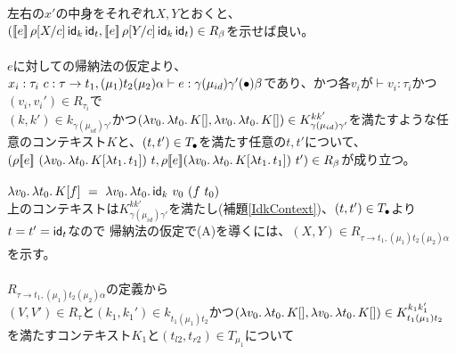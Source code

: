       左右の$x'$の中身をそれぞれ$X,Y$とおくと、\\
      $(\CPS{e}{\rho[\Change{c}{X}]}{\Idk}{\Idt},\CPS{e}{\rho[\Change{c}{Y}]}{\Idk}{\Idt})\in R_{\beta}$を示せば良い。\\
\\
$e$に対しての帰納法の仮定より、\\
$x_i:\tau_i\ c:\tau \rightarrow t_1, (\mu_1) t_2 (\mu_2) \alpha \vdash e : \gamma (\mu_{id}) \gamma' (\Bullet) \beta$であり、かつ各$v_i$が$\vdash v_i:\tau_i$かつ$(v_i,v_i') \in R_{\tau_i}$で\\
$(k,k')\in k_{\gamma (\mu_{id}) \gamma'}$かつ$(\Lam{v_0}{\Lam{t_0}{K[]}}, \Lam{v_0}{\Lam{t_0}{K[]}})\in  K^{kk'}_{\gamma (\mu_{id}) \gamma'}$を満たすような任意のコンテキスト$K$と、$(t, t') \in T_{\Bullet}$を満たす任意の$t, t'$について、\\
$(\rho \CPSTh{e}\ \LamP{v_0}{\Lam{t_0}{K[\Lam{t_1}{t_1}]}}\ t, \rho \CPSTh{e} \LamP{v_0}{\Lam{t_0}{K[\Lam{t_1}{t_1}]}}\ t')\in R_{\beta}$が成り立つ。\\
\\
$\Lam{v_0}{\Lam{t_0}{K[f]}}\ =\ \Lam{v_0}{\Lam{t_0}{\Idk\ v_0\ (f\ t_0)}}$\\
上のコンテキストは$K^{kk'}_{\gamma (\mu_{id}) \gamma'}$を満たし(補題\ref{IdkContext})、$(t, t') \in T_{\Bullet}$より$t=t'=\Idt$なので
帰納法の仮定で(A)を導くには、$(X,Y)\in R_{\tau \rightarrow t_1, (\mu_1) t_2 (\mu_2) \alpha}$を示す。\\
\\
$R_{\tau \rightarrow t_1, (\mu_1) t_2 (\mu_2) \alpha}$の定義から\\
$(V,V')\in R_{\tau}$と$(k_1,k_1')\in k_{t_1 (\mu_1) t_2}$かつ$(\Lam{v_0}{\Lam{t_0}{K[]}}, \Lam{v_0}{\Lam{t_0}{K[]}})\in K^{k_1k_1'}_{t_1 (\mu_1) t_2}$を満たすコンテキスト$K_1$と$(t_{l2},t_{r2})\in T_{\mu_1}$について\\
